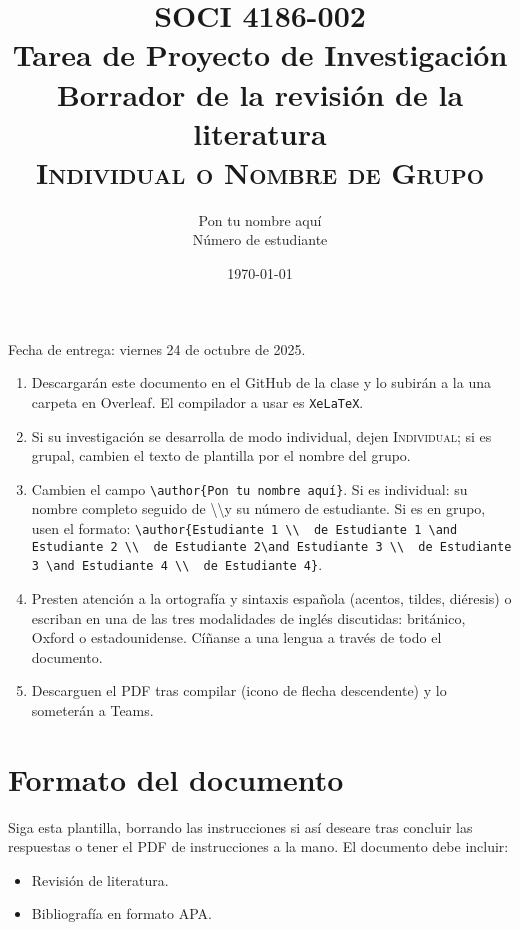 \documentclass[11pt]{article}
\title{SOCI 4186-002\\ Tarea de Proyecto de Investigación \textnumero 3 \\ Borrador de la revisión de la literatura \\ \textsc{Individual o Nombre de Grupo}}
\author{Pon tu nombre aquí \\ Número de estudiante}
\date{\today} %
\begin{document}
\singlespacing
\maketitle
Fecha de entrega: viernes 24 de octubre de 2025.

\begin{enumerate}
    \item Descargarán este documento en el GitHub de la clase y lo subirán a la una carpeta en Overleaf. El compilador a usar es \texttt{XeLaTeX}.
    \item Si su investigación se desarrolla de modo individual, dejen \textsc{Individual}; si es grupal, cambien el texto de plantilla por el nombre del grupo.
    \item Cambien el campo \texttt{\textbackslash author\{Pon tu nombre aquí\}}. Si es individual: su nombre completo seguido de \textbackslash\textbackslash y su número de estudiante. Si es en grupo, usen el formato: \texttt{\textbackslash author\{Estudiante 1 \textbackslash\textbackslash \ \textnumero\ de Estudiante 1 \textbackslash and Estudiante 2 \textbackslash\textbackslash \ \textnumero\ de Estudiante 2\textbackslash and Estudiante 3 \textbackslash\textbackslash \ \textnumero\ de Estudiante 3 \textbackslash and Estudiante 4 \textbackslash\textbackslash\ \textnumero\ de Estudiante 4\}}.
    \item Presten atención a la ortografía y sintaxis española (acentos, tildes, diéresis) o escriban en una de las tres modalidades de inglés discutidas: británico, Oxford o estadounidense. Cíñanse a una lengua a través de todo el documento.
    \item Descarguen el PDF tras compilar (icono de flecha descendente) y lo someterán a Teams.
\end{enumerate}

\section*{Formato del documento}
Siga esta plantilla, borrando las instrucciones si así deseare tras concluir las respuestas o tener el PDF de instrucciones a la mano. El documento debe incluir:
\begin{itemize}
    \item Revisión de literatura.
    \item Bibliografía en formato APA.
\end{itemize}
\onehalfspacing
\end{document}
